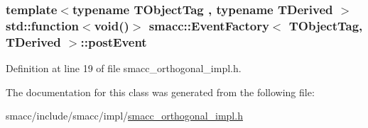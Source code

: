\subsubsection[{\texorpdfstring{post\+Event}{postEvent}}]{\setlength{\rightskip}{0pt plus 5cm}template$<$typename T\+Object\+Tag , typename T\+Derived $>$ std\+::function$<$void()$>$ {\bf smacc\+::\+Event\+Factory}$<$ T\+Object\+Tag, T\+Derived $>$\+::post\+Event\hspace{0.3cm}{\ttfamily [private]}}\hypertarget{classsmacc_1_1EventFactory_ad633758137e9574e942422889952a3ba}{}\label{classsmacc_1_1EventFactory_ad633758137e9574e942422889952a3ba}


Definition at line 19 of file smacc\+\_\+orthogonal\+\_\+impl.\+h.



The documentation for this class was generated from the following file\+:\begin{DoxyCompactItemize}
\item 
smacc/include/smacc/impl/\hyperlink{smacc__orthogonal__impl_8h}{smacc\+\_\+orthogonal\+\_\+impl.\+h}\end{DoxyCompactItemize}
